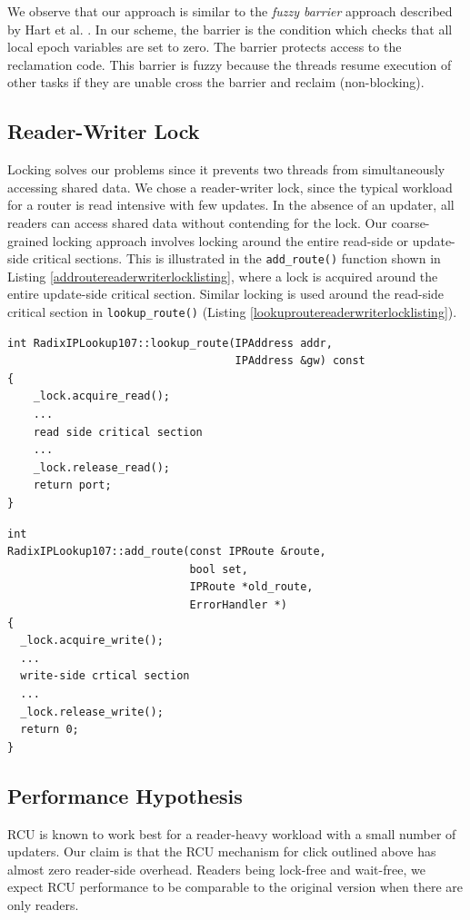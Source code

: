 \documentclass[a4paper,marginparwidth=50pt,marginparsep=10pt]{article}
\begin{document}
We observe that our approach is similar to the \emph{fuzzy barrier} approach described by Hart et al. \cite{hart}. In our scheme, the barrier is the condition which checks that all local epoch variables are set to zero. The barrier protects access to the reclamation code. This barrier is fuzzy because the threads resume execution of other tasks if they are unable cross the barrier and reclaim (non-blocking).

\subsection{Reader-Writer Lock}
Locking solves our problems since it prevents two threads from simultaneously accessing shared data. We chose a reader-writer lock, since the typical workload for a router is read intensive with few updates. In the absence of an updater, all readers can access shared data without contending for the lock. 
 Our coarse-grained locking approach involves locking around the entire read-side or update-side critical sections. This is illustrated in the \verb+add_route()+ function shown in Listing \ref{addroutereaderwriterlocklisting}, where a lock is acquired around the entire update-side critical section. Similar locking is used around the read-side critical section in \verb+lookup_route()+ (Listing \ref{lookuproutereaderwriterlocklisting}).
\begin{lstlisting}[caption = Reader-writer lock usage in lookup\_route(), label=lookuproutereaderwriterlocklisting,float=tph]
int RadixIPLookup107::lookup_route(IPAddress addr, 
                                   IPAddress &gw) const
{  
    _lock.acquire_read();
    ...
    read side critical section
    ...
    _lock.release_read();
    return port;
}
\end{lstlisting}
\begin{lstlisting}[caption = Reader-writer lock usage in add\_route(), label=addroutereaderwriterlocklisting,float=tph]
int
RadixIPLookup107::add_route(const IPRoute &route, 
                            bool set, 
                            IPRoute *old_route, 
                            ErrorHandler *)
{
  _lock.acquire_write();
  ...
  write-side crtical section
  ...
  _lock.release_write();
  return 0;
}
\end{lstlisting}  
\subsection{Performance Hypothesis}
\label{sec:perfhypothesis}
RCU is known to work best for a reader-heavy workload with a small number of updaters. Our claim is that the RCU mechanism for click outlined above has almost zero reader-side overhead. Readers being lock-free and wait-free, we expect RCU performance to be comparable to the original version when there are only readers.\\
\end{document}
